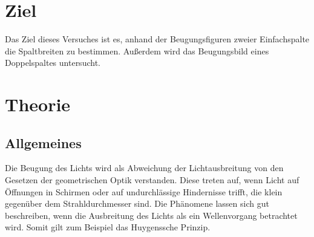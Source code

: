 \section{Ziel}
Das Ziel dieses Versuches ist es, anhand der Beugungsfiguren
zweier Einfachspalte die Spaltbreiten zu bestimmen.
Außerdem wird das Beugungsbild eines Doppelspaltes
untersucht. %

\section{Theorie}
\label{sec:Theorie}

\subsection{Allgemeines}
Die Beugung des Lichts wird als Abweichung der 
Lichtausbreitung von den Gesetzen der geometrischen Optik 
verstanden. Diese treten auf, wenn Licht auf Öffnungen in 
Schirmen oder auf undurchlässige Hindernisse trifft, die klein
gegenüber dem Strahldurchmesser sind. Die 
Phänomene lassen sich gut beschreiben, wenn die 
Ausbreitung des Lichts als ein Wellenvorgang betrachtet wird. 
Somit gilt zum Beispiel das Huygenssche Prinzip. 

